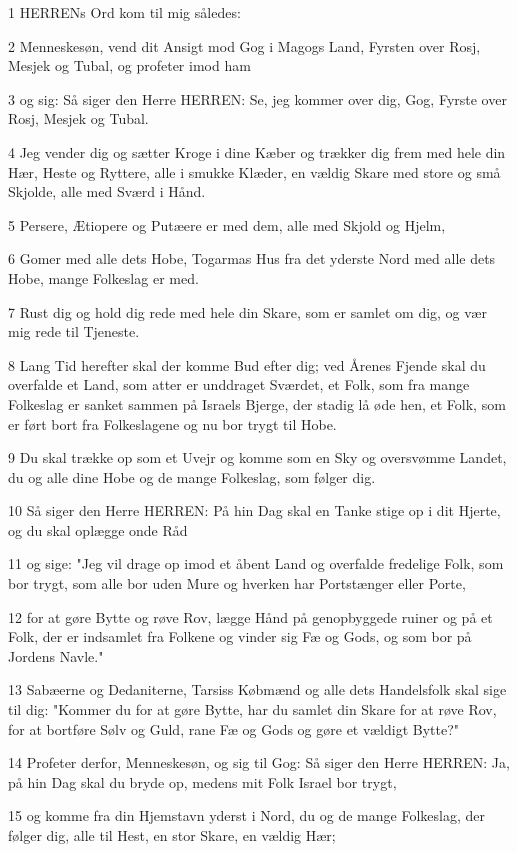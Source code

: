 \par 1 HERRENs Ord kom til mig således:
\par 2 Menneskesøn, vend dit Ansigt mod Gog i Magogs Land, Fyrsten over Rosj, Mesjek og Tubal, og profeter imod ham
\par 3 og sig: Så siger den Herre HERREN: Se, jeg kommer over dig, Gog, Fyrste over Rosj, Mesjek og Tubal.
\par 4 Jeg vender dig og sætter Kroge i dine Kæber og trækker dig frem med hele din Hær, Heste og Ryttere, alle i smukke Klæder, en vældig Skare med store og små Skjolde, alle med Sværd i Hånd.
\par 5 Persere, Ætiopere og Putæere er med dem, alle med Skjold og Hjelm,
\par 6 Gomer med alle dets Hobe, Togarmas Hus fra det yderste Nord med alle dets Hobe, mange Folkeslag er med.
\par 7 Rust dig og hold dig rede med hele din Skare, som er samlet om dig, og vær mig rede til Tjeneste.
\par 8 Lang Tid herefter skal der komme Bud efter dig; ved Årenes Fjende skal du overfalde et Land, som atter er unddraget Sværdet, et Folk, som fra mange Folkeslag er sanket sammen på Israels Bjerge, der stadig lå øde hen, et Folk, som er ført bort fra Folkeslagene og nu bor trygt til Hobe.
\par 9 Du skal trække op som et Uvejr og komme som en Sky og oversvømme Landet, du og alle dine Hobe og de mange Folkeslag, som følger dig.
\par 10 Så siger den Herre HERREN: På hin Dag skal en Tanke stige op i dit Hjerte, og du skal oplægge onde Råd
\par 11 og sige: "Jeg vil drage op imod et åbent Land og overfalde fredelige Folk, som bor trygt, som alle bor uden Mure og hverken har Portstænger eller Porte,
\par 12 for at gøre Bytte og røve Rov, lægge Hånd på genopbyggede ruiner og på et Folk, der er indsamlet fra Folkene og vinder sig Fæ og Gods, og som bor på Jordens Navle."
\par 13 Sabæerne og Dedaniterne, Tarsiss Købmænd og alle dets Handelsfolk skal sige til dig: "Kommer du for at gøre Bytte, har du samlet din Skare for at røve Rov, for at bortføre Sølv og Guld, rane Fæ og Gods og gøre et vældigt Bytte?"
\par 14 Profeter derfor, Menneskesøn, og sig til Gog: Så siger den Herre HERREN: Ja, på hin Dag skal du bryde op, medens mit Folk Israel bor trygt,
\par 15 og komme fra din Hjemstavn yderst i Nord, du og de mange Folkeslag, der følger dig, alle til Hest, en stor Skare, en vældig Hær;
